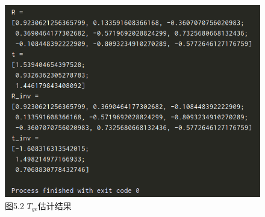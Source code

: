\documentclass[40pt,a4paper，UTF8]{ctexart}
\numberwithin{equation}{section}
\begin{document}
\begin{figure}[H]
\centering
\includegraphics[scale=0.5]{ch5_5_2.png} {\\图5.2 $T_{ge}$估计结果}
\end{figure}
\end{document}
